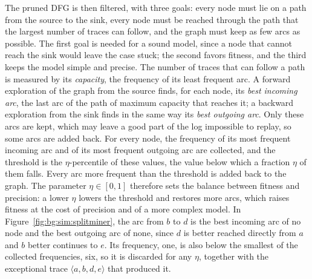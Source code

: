     The pruned DFG is then filtered, with three goals: every node must lie on a
    path from the source to the sink, every node must be reached through the path
    that the largest number of traces can follow, and the graph must keep as few
    arcs as possible. The first goal is needed for a sound model, since a node
    that cannot reach the sink would leave the case stuck; the second favors
    fitness, and the third keeps the model simple and
    precise. The number of traces that can follow a
    path is measured by its \emph{capacity}, the frequency of its least frequent
    arc. A forward exploration of the graph from the source finds, for each node,
    its \emph{best incoming arc}, the last arc of the path of maximum capacity
    that reaches it; a backward exploration from the sink finds in the same way
    its \emph{best outgoing arc}. Only these arcs are kept, which may leave a
    good part of the log impossible to replay, so some arcs are added back. For every
    node, the frequency of its most frequent incoming arc and of its most frequent
    outgoing arc are collected, and the threshold is the $\eta$-percentile of
    these values, the value below which a fraction $\eta$ of them falls. Every
    arc more frequent than the threshold is added back to the
    graph. The parameter $\eta \in [0, 1]$ therefore
    sets the balance between fitness and precision: a lower $\eta$ lowers the
    threshold and restores more arcs, which raises fitness at the cost of
    precision and of a more complex model. In
    Figure~\ref{fig:bg:sim:splitminer}, the arc from $b$ to $d$ is the best
    incoming arc of no node and the best outgoing arc of none, since $d$ is better
    reached directly from $a$ and $b$ better continues to $e$. Its frequency, one,
    is also below the smallest of the collected frequencies, six, so it is
    discarded for any $\eta$, together with the exceptional trace
    $\langle a, b, d, e \rangle$ that produced it.
    
